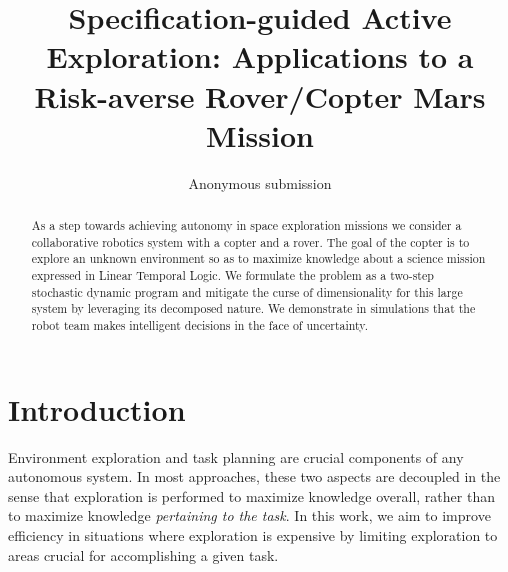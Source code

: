 \documentclass[conference]{IEEEtran}
\begin{document}



\title{\huge Specification-guided Active Exploration: Applications to a Risk-averse Rover/Copter Mars Mission}



\author{Anonymous submission}

\maketitle

\begin{abstract}
  As a step towards achieving autonomy in space exploration missions we consider a collaborative robotics system with a copter and a rover. The goal of the copter is to explore an unknown environment so as to maximize knowledge about a science mission expressed in Linear Temporal Logic. We formulate the problem as a two-step stochastic dynamic program and mitigate the curse of dimensionality for this large system by leveraging its decomposed nature. We demonstrate in simulations that the robot team makes intelligent decisions in the face of uncertainty.
\end{abstract}

\IEEEpeerreviewmaketitle



\section{Introduction}

Environment exploration and task planning are crucial components of any autonomous system. In most approaches, these two aspects are decoupled in the sense that exploration is performed to maximize knowledge overall, rather than to maximize knowledge \emph{pertaining to the task}. In this work, we aim to improve efficiency in situations where exploration is expensive by limiting exploration to areas crucial for accomplishing a given task.
\end{document}
